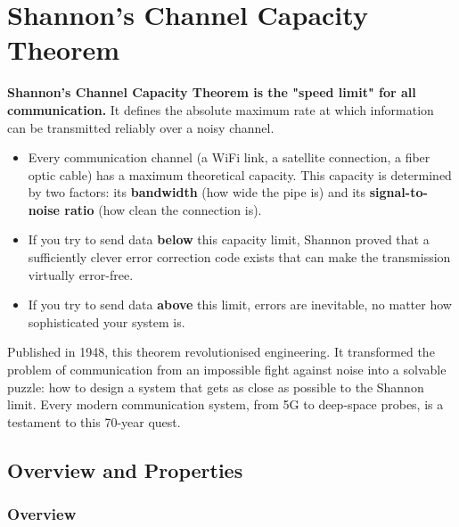
\chapter{Shannon's Channel Capacity Theorem}
\label{ch:shannon}

\begin{nontechnical}
    \textbf{Shannon's Channel Capacity Theorem is the "speed limit" for all communication.} It defines the absolute maximum rate at which information can be transmitted reliably over a noisy channel.

    \begin{itemize}
        \item Every communication channel (a WiFi link, a satellite connection, a fiber optic cable) has a maximum theoretical capacity. This capacity is determined by two factors: its \textbf{bandwidth} (how wide the pipe is) and its \textbf{signal-to-noise ratio} (how clean the connection is).
        \item If you try to send data \textbf{below} this capacity limit, Shannon proved that a sufficiently clever error correction code exists that can make the transmission virtually error-free.
        \item If you try to send data \textbf{above} this limit, errors are inevitable, no matter how sophisticated your system is.
    \end{itemize}

     Published in 1948, this theorem revolutionised engineering. It transformed the problem of communication from an impossible fight against noise into a solvable puzzle: how to design a system that gets as close as possible to the Shannon limit. Every modern communication system, from 5G to deep-space probes, is a testament to this 70-year quest.
\end{nontechnical}


\section{Overview and Properties}

\subsection{Overview}

